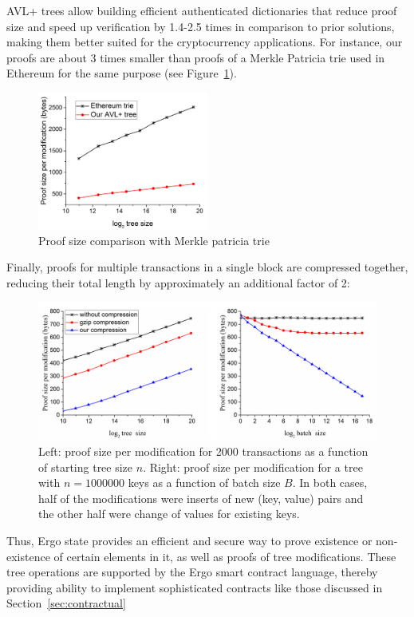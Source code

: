 AVL+ trees allow building efficient authenticated dictionaries that reduce proof size and speed up verification by 1.4-2.5 times in comparison to prior solutions, making them better suited for the cryptocurrency applications.
For instance, our proofs are about 3 times smaller than proofs of a Merkle Patricia trie used in Ethereum for the same purpose (see Figure~\ref{fig:proofSize}).


\begin{figure}[H]
    \centering
    \includegraphics[width=0.5\textwidth]{img/proofSize.png}
    \caption{Proof size comparison with Merkle patricia trie
    \label{fig:proofSize} }
\end{figure}

Finally, proofs for multiple transactions in a single block are compressed together, reducing their total length
by approximately an additional factor of 2:

\begin{figure}[H]
    \centering
    \includegraphics[width=\textwidth]{img/compression.png}
    \caption{Left: proof size per modification for 2000 transactions as a function of starting tree size $n$.
    Right: proof size per modification for a tree with $n = 1 000 000$ keys as a function of batch size $B$.
    In both cases, half of the modifications were inserts of new (key, value) pairs and the other half were change of values for existing keys.
    \label{fig:compression} }
\end{figure}

Thus, Ergo state provides an efficient and secure way to prove existence or non-existence of certain elements in
it, as well as proofs of tree modifications.
These tree operations are supported by the Ergo smart contract language, thereby providing ability to implement sophisticated contracts like those discussed in Section~\ref{sec:contractual}





